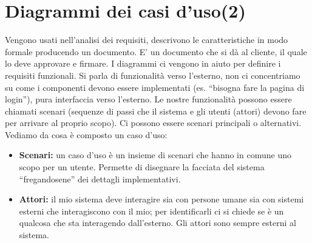 



\section{Diagrammi dei casi d'uso(2)}

Vengono usati nell'analisi dei requisiti, descrivono le caratteristiche in modo formale producendo un documento. E' un documento che si dà al cliente, il quale lo deve approvare e firmare. I diagrammi ci vengono in aiuto per definire i requisiti funzionali. Si parla di funzionalità verso l'esterno, non ci concentriamo su come i componenti devono essere implementati (es. “bisogna fare la pagina di login”), pura interfaccia verso l'esterno. Le nostre funzionalità possono essere chiamati scenari (sequenze di passi che il sistema e gli utenti (attori) devono fare per arrivare al proprio scopo). Ci possono essere scenari principali o alternativi.
\\
Vediamo da cosa è composto un caso d'uso:
\begin{itemize}
	\item \textbf{Scenari:} un caso d'uso è un insieme di scenari che hanno in comune uno scopo per un utente. Permette di disegnare la facciata del sistema “fregandosene” dei dettagli implementativi.
	\item \textbf{Attori:} il mio sistema deve interagire sia con persone umane sia con sistemi esterni che interagiscono con il mio; per identificarli ci si chiede se è un qualcosa che sta interagendo dall'esterno. Gli attori sono sempre esterni al sistema.
\end{itemize}


